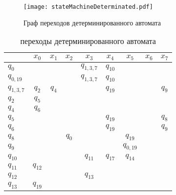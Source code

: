 \documentclass[a4paper,14pt,russian]{extarticle} %
\begin{document}
\begin{sidewaysfigure}
	\texttt{[image: stateMachineDeterminated.pdf]}%
	\caption{Граф переходов детерминированного автомата}
	\label{fig:state_machine_determ}
\end{sidewaysfigure}

\begin{table}[H]
	\centering
	\begin{threeparttable}	
		\caption{переходы детерминированного автомата}	
		\renewcommand{\arraystretch}{0.7}
		\renewcommand{\tabcolsep}{0.9em}	
		\label{tab:state_machine_determ} 
		\begin{tabular}{| l | c |c |c |c |c |c |c |c |}
			\hline
			& \({x_{0}}\) & \({x_{1}}\) & \({x_{2}}\) & \({x_{3}}\) & \({x_{4}}\) & \({x_{5}}\) & \({x_{6}}\) & \({x_{7}}\) \\ \hline
			\({q_{0}}\) & \(\) & \(\) & \(\) & \({q_{1,3,7}}\) & \({q_{10}}\) & \(\) & \(\) & \(\) \\ \hline
			\({q_{0,19}}\) & \(\) & \(\) & \(\) & \({q_{1,3,7}}\) & \({q_{10}}\) & \(\) & \(\) & \(\) \\ \hline
			\({q_{1,3,7}}\) & \({q_{2}}\) & \({q_{4}}\) & \(\) & \(\) & \({q_{19}}\) & \(\) & \(\) & \({q_{9}}\) \\ \hline
			\({q_{2}}\) & \({q_{5}}\) & \(\) & \(\) & \(\) & \(\) & \(\) & \(\) & \(\) \\ \hline
			\({q_{4}}\) & \({q_{6}}\) & \(\) & \(\) & \(\) & \(\) & \(\) & \(\) & \(\) \\ \hline
			\({q_{5}}\) & \(\) & \(\) & \(\) & \(\) & \({q_{19}}\) & \(\) & \(\) & \({q_{8}}\) \\ \hline
			\({q_{6}}\) & \(\) & \(\) & \(\) & \(\) & \({q_{19}}\) & \(\) & \(\) & \({q_{9}}\) \\ \hline
			\({q_{8}}\) & \(\) & \(\) & \({q_{0}}\) & \(\) & \(\) & \({q_{19}}\) & \(\) & \(\) \\ \hline
			\({q_{9}}\) & \(\) & \(\) & \(\) & \(\) & \(\) & \({q_{0,19}}\) & \(\) & \(\) \\ \hline
			\({q_{10}}\) & \(\) & \(\) & \(\) & \({q_{11}}\) & \({q_{17}}\) & \({q_{14}}\) & \(\) & \(\) \\ \hline
			\({q_{11}}\) & \({q_{12}}\) & \(\) & \(\) & \(\) & \(\) & \(\) & \(\) & \(\) \\ \hline
			\({q_{12}}\) & \(\) & \(\) & \(\) & \({q_{13}}\) & \(\) & \(\) & \(\) & \(\) \\ \hline
			\({q_{13}}\) & \({q_{19}}\) & \(\) & \(\) & \(\) & \(\) & \(\) & \(\) & \(\) \\ \hline

\end{tabular}
\end{threeparttable}
\end{table}
\end{document}
